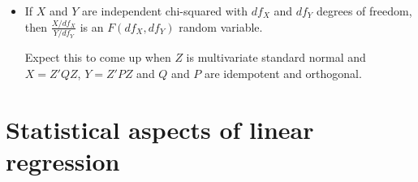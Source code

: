 \begin{itemize}
\item %
  \begin{defn}
    If $X$ and $Y$ are independent chi-squared with $df_X$ and $df_Y$
    degrees of freedom, then $\frac{X/df_X}{Y/df_Y}$ is an $F(df_X,
    df_Y)$ random variable.
  \end{defn}

  Expect this to come up when $Z$ is multivariate standard normal and
  $X = Z'QZ$, $Y = Z'PZ$ and $Q$ and $P$ are idempotent and orthogonal.

\end{itemize}

\section{Statistical aspects of linear regression}


